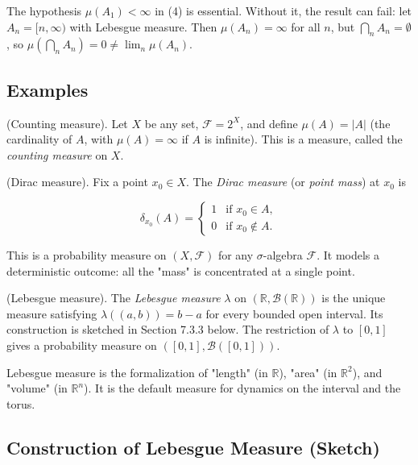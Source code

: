 The hypothesis $\mu(A_1) < \infty$ in (4) is essential. Without it, the result can fail: let $A_n = [n, \infty)$ with Lebesgue measure. Then $\mu(A_n) = \infty$ for all $n$, but $\bigcap_n A_n = \emptyset$, so $\mu(\bigcap_n A_n) = 0 \neq \lim_n \mu(A_n)$.

\subsection{Examples}\label{sec:7.3.2}

\begin{example}
(Counting measure). Let $X$ be any set, $\mathcal{F} = 2^X$, and define $\mu(A) = |A|$ (the cardinality of $A$, with $\mu(A) = \infty$ if $A$ is infinite). This is a measure, called the \textit{counting measure} on $X$.
\end{example}


\begin{example}
(Dirac measure). Fix a point $x_0 \in X$. The \textit{Dirac measure} (or \textit{point mass}) at $x_0$ is

\[
\delta_{x_0}(A) = \begin{cases} 1 & \text{if } x_0 \in A, \\ 0 & \text{if } x_0 \notin A. \end{cases}
\]

This is a probability measure on $(X, \mathcal{F})$ for any $\sigma$-algebra $\mathcal{F}$. It models a deterministic outcome: all the "mass" is concentrated at a single point.
\end{example}


\begin{example}
(Lebesgue measure). The \textit{Lebesgue measure} $\lambda$ on $(\mathbb{R}, \mathcal{B}(\mathbb{R}))$ is the unique measure satisfying $\lambda((a,b)) = b - a$ for every bounded open interval. Its construction is sketched in Section 7.3.3 below. The restriction of $\lambda$ to $[0,1]$ gives a probability measure on $([0,1], \mathcal{B}([0,1]))$.

Lebesgue measure is the formalization of "length" (in $\mathbb{R}$), "area" (in $\mathbb{R}^2$), and "volume" (in $\mathbb{R}^n$). It is the default measure for dynamics on the interval and the torus.
\end{example}


\subsection{Construction of Lebesgue Measure (Sketch)}\label{sec:7.3.3}

